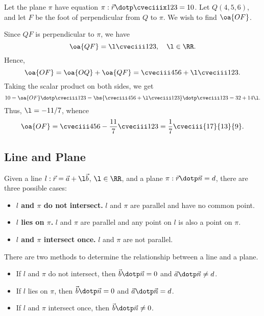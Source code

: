 \begin{example}
    Let the plane $\pi$ have equation $\pi : \vec r \dotp \cveciiix123 = 10$. Let $Q(4, 5, 6)$, and let $F$ be the foot of perpendicular from $Q$ to $\pi$. We wish to find $\oa{OF}$.

    Since $QF$ is perpendicular to $\pi$, we have \[\oa{QF} = \l \cveciii123, \quad \l \in \RR.\] Hence, \[\oa{OF} = \oa{OQ} + \oa{QF} = \cveciii456 + \l\cveciii123.\] Taking the scalar product on both sides, we get \[10 = \oa{OF} \dotp \cveciii123 = \bs{\cveciii456 + \l\cveciii123} \dotp \cveciii123 = 32 + 14\l.\] Thus, $\l = -11/7$, whence \[\oa{OF} = \cveciii456 - \frac{11}{7}\cveciii123 = \frac17 \cveciii{17}{13}{9}.\]
\end{example}

\subsection{Line and Plane}

\begin{fact}
    Given a line $l : \vec r = \vec a + \l \vec b$, $\l \in \RR$, and a plane $\pi : \vec r \dotp \vec n = d$, there are three possible cases:
    \begin{itemize}
        \item \textbf{$l$ and $\pi$ do not intersect.} $l$ and $\pi$ are parallel and have no common point.
        \item \textbf{$l$ lies on $\pi$.} $l$ and $\pi$ are parallel and any point on $l$ is also a point on $\pi$.
        \item \textbf{$l$ and $\pi$ intersect once.} $l$ and $\pi$ are not parallel.
    \end{itemize}
\end{fact}

There are two methods to determine the relationship between a line and a plane.

\begin{recipe}
    \phantom{.}
    \begin{itemize}
        \item If $l$ and $\pi$ do not intersect, then $\vec b \dotp \vec n = 0$ and $\vec a \dotp \vec n \neq d$.
        \item If $l$ lies on $\pi$, then $\vec b \dotp \vec n = 0$ and $\vec a \dotp \vec n =  d$.
        \item If $l$ and $\pi$ intersect once, then $\vec b \dotp \vec n \neq 0$.
    \end{itemize}
\end{recipe}


